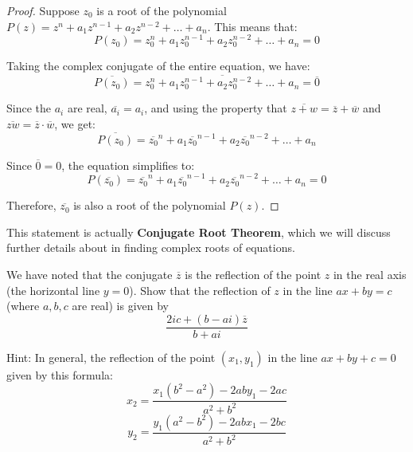 \documentclass[
	12pt, %
	fleqn, %
	a4paper, %
]{LegrandOrangeBook}
\begin{document}
                \begin{proof}
                Suppose \( z_0 \) is a root of the polynomial \( P(z) = z^n + a_1z^{n-1} + a_2z^{n-2} + \ldots + a_n \). This means that:
                \[ P(z_0) = z_0^n + a_1z_0^{n-1} + a_2z_0^{n-2} + \ldots + a_n = 0 \]
                
                Taking the complex conjugate of the entire equation, we have:
                \[ \overline{P(z_0)} = \overline{z_0^n + a_1z_0^{n-1} + a_2z_0^{n-2} + \ldots + a_n} = \overline{0} \]
                
                Since the \( a_i \) are real, \( \overline{a_i} = a_i \), and using the property that \( \overline{z + w} = \overline{z} + \overline{w} \) and \( \overline{zw} = \overline{z}\cdot \overline{w} \), we get:
                \[ \overline{P(z_0)} = \overline{z_0}^n + a_1\overline{z_0}^{n-1} + a_2\overline{z_0}^{n-2} + \ldots + a_n \]
                
                Since \( \overline{0} = 0 \), the equation simplifies to:
                \[ P(\overline{z_0}) = \overline{z_0}^n + a_1\overline{z_0}^{n-1} + a_2\overline{z_0}^{n-2} + \ldots + a_n = 0 \]
                
                Therefore, \( \overline{z_0} \) is also a root of the polynomial \( P(z) \).
                \end{proof}
                \begin{remark}
                    This statement is actually \textbf{Conjugate Root Theorem}, which we will discuss further details about in finding
                    complex roots of equations.
                \end{remark}
            \begin{exercise}
                We have noted that the conjugate \( \overline{z} \) is the reflection of the point \( z \) in the real axis (the horizontal line \( y = 0 \)). Show that the reflection of \( z \) in the line \( ax + by = c \) (where \( a, b, c \) are real) is given by
\[ \frac{2ic    + (b - ai)\overline{z}}{b + ai} \]
            \end{exercise}
            Hint: In general, the reflection of the point \( (x_1, y_1) \) in the line \( ax + by + c = 0 \) given by this formula:
            \[ 
            x_2 = \frac{x_1(b^2 - a^2) - 2aby_1 - 2ac}{a^2 + b^2}
            \]
            \[ 
            y_2 = \frac{y_1(a^2 - b^2) - 2abx_1 - 2bc}{a^2 + b^2}
            \]
            
\end{document}
